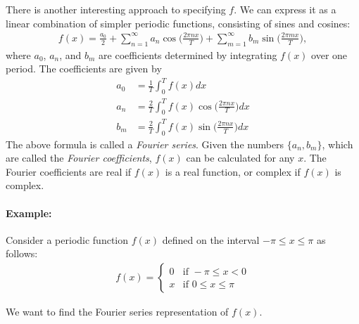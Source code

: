 There is another interesting approach to specifying $f$. We can express it as a linear combination of simpler periodic functions, consisting of sines and cosines:
\begin{align}
	f(x) = \frac{a_0}{2}+\sum_{n=1}^{\infty} a_n \cos\bigg(\frac{2\pi n x}{T}\bigg)+\sum_{m=1}^{\infty}b_m \sin\bigg(\frac{2\pi m x}{T}\bigg),
	\label{eq:fourier_series}
\end{align}
where $a_0$, $a_n$, and $b_m$ are coefficients determined by integrating $f(x)$ over one period. The coefficients are given by
\begin{align*}
	a_0 &= \frac{1}{T}\int_0^Tf(x)dx\\
	a_n	&= \frac{2}{T}\int_0^Tf(x)\cos\bigg(\frac{2\pi nx}{T}\bigg)dx\\
	b_m	&= \frac{2}{T}\int_0^Tf(x)\sin\bigg(\frac{2\pi nx}{T}\bigg)dx
\end{align*}
The above formula is called a \textit{Fourier series}. Given the numbers $\{a_n, b_m\}$, which are called the \textit{Fourier coefficients}, $f(x)$ can be calculated for any $x$. The Fourier coefficients are real if $f(x)$ is a real function, or complex if $f(x)$ is complex.


\paragraph{Example: }Consider a periodic function $f(x)$ defined on the interval $-\pi\leq x \leq\pi$ as follows:
\begin{align*}
f(x)= 
\begin{cases}
	0 & \text{if } -\pi \leq x < 0 \\
	x & \text{if } 0 \leq x \leq \pi
\end{cases}
\end{align*}

We want to find the Fourier series representation of \( f(x) \).
